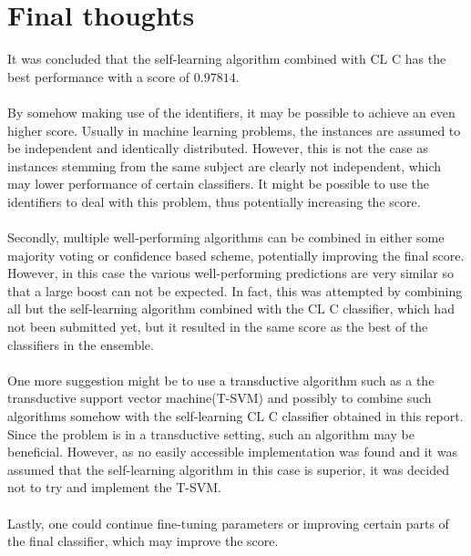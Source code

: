 \documentclass [a4paper] {report}
\begin{document}
	\section*{Final thoughts}
	It was concluded that the self-learning algorithm combined with $\text{CL C}$ has the best performance with a score of $0.97814$. \\\\
	By somehow making use of the identifiers, it may be possible to achieve an even higher score. Usually in machine learning problems, the instances are assumed to be independent and identically distributed. However, this is not the case as instances stemming from the same subject are clearly not independent, which may lower performance of certain classifiers. It might be possible to use the identifiers to deal with this problem, thus potentially increasing the score. \\\\
	Secondly, multiple well-performing algorithms can be combined in either some majority voting or confidence based scheme, potentially improving the final score. However, in this case the various well-performing predictions are very similar so that a large boost can not be expected. In fact, this was attempted by combining all but the self-learning algorithm combined with the $\text{CL C}$ classifier, which had not been submitted yet, but it resulted in the same score as the best of the classifiers in the ensemble.\\\\
	One more suggestion might be to use a transductive algorithm such as a the transductive support vector machine(T-SVM) and possibly to combine such algorithms somehow with the self-learning $\text{CL C}$ classifier obtained in this report. Since the problem is in a transductive setting, such an algorithm may be beneficial. However, as no easily accessible implementation was found and it was assumed that the self-learning algorithm in this case is superior, it was decided not to try and implement the T-SVM.\\\\
	Lastly, one could continue fine-tuning parameters or improving certain parts of the final classifier, which may improve the score.
	
	
\end{document}
